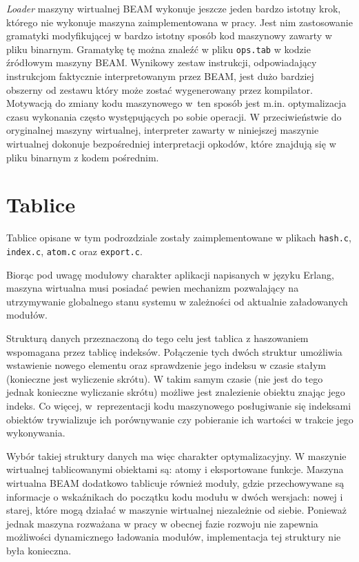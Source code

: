 \emph{Loader} maszyny wirtualnej BEAM wykonuje jeszcze jeden bardzo istotny krok, którego nie wykonuje maszyna zaimplementowana w pracy. Jest nim zastosowanie gramatyki modyfikującej w bardzo istotny sposób kod maszynowy zawarty w pliku binarnym. Gramatykę tę można znaleźć w pliku \texttt{ops.tab} w kodzie źródłowym maszyny BEAM. Wynikowy zestaw instrukcji, odpowiadający instrukcjom faktycznie interpretowanym przez BEAM, jest dużo bardziej obszerny od zestawu który może zostać wygenerowany przez kompilator. Motywacją do zmiany kodu maszynowego w~ten sposób jest m.in. optymalizacja czasu wykonania często występujących po sobie operacji. W przeciwieństwie do oryginalnej maszyny wirtualnej, interpreter zawarty w niniejszej maszynie wirtualnej dokonuje bezpośredniej interpretacji opkodów, które znajdują się w pliku binarnym z kodem pośrednim.

\section{Tablice}
\label{sec:maszynaTablice}

Tablice opisane w tym podrozdziale zostały zaimplementowane w plikach \texttt{hash.c}, \texttt{index.c}, \texttt{atom.c} oraz \texttt{export.c}.

Biorąc pod uwagę modułowy charakter aplikacji napisanych w języku Erlang, maszyna wirtualna musi posiadać pewien mechanizm pozwalający na utrzymywanie globalnego stanu systemu w zależności od aktualnie załadowanych modułów.

Strukturą danych przeznaczoną do tego celu jest tablica z haszowaniem wspomagana przez tablicę indeksów. Połączenie tych dwóch struktur umożliwia wstawienie nowego elementu oraz sprawdzenie jego indeksu w czasie stałym (konieczne jest wyliczenie skrótu). W takim samym czasie (nie jest do tego jednak konieczne wyliczanie skrótu) możliwe jest znalezienie obiektu znając jego indeks. Co więcej, w~reprezentacji kodu maszynowego posługiwanie się indeksami obiektów trywializuje ich porównywanie czy pobieranie ich wartości w trakcie jego wykonywania.

Wybór takiej struktury danych ma więc charakter optymalizacyjny. W maszynie wirtualnej tablicowanymi obiektami są: atomy i eksportowane funkcje. Maszyna wirtualna BEAM dodatkowo tablicuje również moduły, gdzie przechowywane są informacje o wskaźnikach do początku kodu modułu w dwóch wersjach: nowej i starej, które mogą działać w maszynie wirtualnej niezależnie od siebie. Ponieważ jednak maszyna rozważana w pracy w obecnej fazie rozwoju nie zapewnia możliwości dynamicznego ładowania modułów, implementacja tej struktury nie była konieczna.

